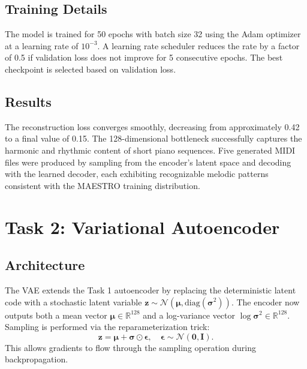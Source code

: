 \documentclass{article}
\begin{document}
\subsection{Training Details}

The model is trained for 50 epochs with batch size 32 using the Adam optimizer at a learning rate of $10^{-3}$. A learning rate scheduler reduces the rate by a factor of 0.5 if validation loss does not improve for 5 consecutive epochs. The best checkpoint is selected based on validation loss.

\subsection{Results}

The reconstruction loss converges smoothly, decreasing from approximately 0.42 to a final value of 0.15. The 128-dimensional bottleneck successfully captures the harmonic and rhythmic content of short piano sequences. Five generated MIDI files were produced by sampling from the encoder's latent space and decoding with the learned decoder, each exhibiting recognizable melodic patterns consistent with the MAESTRO training distribution.

\section{Task 2: Variational Autoencoder}
\label{sec:task2}

\subsection{Architecture}

The VAE extends the Task 1 autoencoder by replacing the deterministic latent code with a stochastic latent variable $\mathbf{z} \sim \mathcal{N}(\boldsymbol{\mu}, \text{diag}(\boldsymbol{\sigma}^2))$. The encoder now outputs both a mean vector $\boldsymbol{\mu} \in \mathbb{R}^{128}$ and a log-variance vector $\log \boldsymbol{\sigma}^2 \in \mathbb{R}^{128}$. Sampling is performed via the reparameterization trick:
\begin{equation}
  \mathbf{z} = \boldsymbol{\mu} + \boldsymbol{\sigma} \odot \boldsymbol{\epsilon}, \quad \boldsymbol{\epsilon} \sim \mathcal{N}(\mathbf{0}, \mathbf{I}).
\end{equation}
This allows gradients to flow through the sampling operation during backpropagation.
\end{document}
